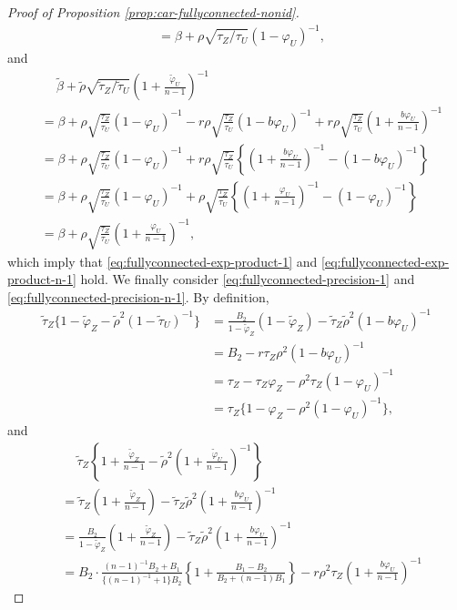 \documentclass[10pt,a4paper]{amsart}
\begin{document}
\begin{proof}[Proof of Proposition \ref{prop:car-fullyconnected-nonid}]
\begin{align*}
&= \beta + \rho\sqrt{\tau_Z/\tau_U}(1-\varphi_U)^{-1},
\end{align*} 
and 
\begin{align*}
& \quad \ \tilde\beta + \tilde\rho\sqrt{\tilde\tau_Z/\tilde\tau_U}\left(1+\frac{\tilde\varphi_U}{n-1}\right)^{-1} 
\\
&= \beta + \rho\sqrt{\frac{\tau_Z}{\tau_U}}(1-\varphi_U)^{-1} - r\rho\sqrt{\frac{\tau_Z}{\tau_U}}(1-b\varphi_U)^{-1} + r\rho\sqrt{\frac{\tau_Z}{\tau_U}}\left(1+ \frac{b\varphi_U}{n-1} \right)^{-1} \\
&= \beta + \rho\sqrt{\frac{\tau_Z}{\tau_U}}(1-\varphi_U)^{-1} + r\rho \sqrt{\frac{\tau_Z}{\tau_U}}\left\{\left(1+ \frac{b\varphi_U}{n-1} \right)^{-1}-(1-b\varphi_U)^{-1} \right\} \\
&= \beta + \rho\sqrt{\frac{\tau_Z}{\tau_U}}(1-\varphi_U)^{-1} + \rho\sqrt{\frac{\tau_Z}{\tau_U}}\left\{\left(1+ \frac{\varphi_U}{n-1} \right)^{-1}-(1-\varphi_U)^{-1}\right\}\\
&= \beta +\rho\sqrt{\frac{\tau_Z}{\tau_U}}\left(1+ \frac{\varphi_U}{n-1} \right)^{-1},
\end{align*} 
which imply that \eqref{eq:fullyconnected-exp-product-1} and \eqref{eq:fullyconnected-exp-product-n-1} hold. 
We finally consider \eqref{eq:fullyconnected-precision-1}
and \eqref{eq:fullyconnected-precision-n-1}. 
By definition, 
\begin{align*}
\tilde\tau_Z\{1-\tilde\varphi_Z - \tilde\rho^2(1-\tilde\tau_U)^{-1}\} &= \frac{B_2}{1-\tilde\varphi_Z}(1-\tilde\varphi_Z) - \tilde\tau_Z\tilde\rho^2(1-b\varphi_U)^{-1}
\\ &= B_2 - r \tau_Z \rho^2 (1-b\varphi_U)^{-1} \\
&= \tau_Z - \tau_Z \varphi_Z - \rho^2\tau_Z(1-\varphi_U)^{-1} 
\\ &= \tau_Z \{ 1 - \varphi_Z - \rho^2(1-\varphi_U)^{-1} \}, 
\end{align*} 
and 
\begin{align*}
& \quad \ \tilde\tau_Z\left\{1+ \frac{\tilde\varphi_Z}{n-1} - \tilde\rho^2 \left( 1+ \frac{\tilde\varphi_U}{n-1}\right)^{-1}\right\} 
\\
&= \tilde\tau_Z\left(1+\frac{\tilde\varphi_Z}{n-1} \right) - \tilde\tau_Z\tilde\rho^2\left(1+\frac{b\varphi_U}{n-1}\right)^{-1} 
\\ &= 
\frac{B_2}{1 -\tilde\varphi_Z }\left(1+\frac{\tilde\varphi_Z}{n-1} \right) - \tilde\tau_Z\tilde\rho^2\left(1+\frac{b\varphi_U}{n-1}\right)^{-1}
\\
&= 
B_2 \cdot \frac{(n-1)^{-1}B_2+B_1}{\{(n-1)^{-1} + 1\}B_2}\left\{ 1+\frac{B_1-B_2}{B_2 + (n-1)B_1}\right\} - r\rho^2\tau_Z\left(1+\frac{b\varphi_U}{n-1}\right)^{-1}

\end{align*}
\end{proof}
\end{document}
